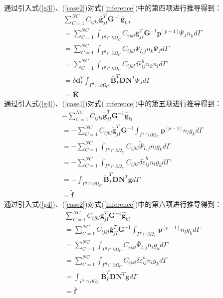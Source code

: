 通过引入式(\ref{g3})、(\ref{case2})对式(\ref{inference})中的第四项进行推导得到：
\begin{equation}\label{CH4-barK}
\begin{split}
    &\sum_{C=1}^{N\!C}C_{ijkl}\bar{\pmb g}^T_{jI}\pmb{G}^{-1}\bar{\pmb g}_{kJ}\\
    &=\sum_{C=1}^{N\!C}\int_{\Gamma^g\cap\partial\Omega_C}C_{ijkl}\bar{\pmb g}_{jI}^T\pmb{G}^{-1}\pmb{p}^{[p-1]}\Psi_Jn_kd\Gamma\\
    &=\sum_{C=1}^{N\!C}\int_{\Gamma^g\cap\partial\Omega_C}C_{ijkl}\bar{\Psi}_{I,j}n_k\Psi_{J}d\Gamma\\
    &=\sum_{C=1}^{N\!C}\int_{\Gamma^g\cap\partial\Omega_C}C_{ijkl}\delta\bar{\varepsilon}_{ij}^hn_ku_ld\Gamma\\
    &=\delta\pmb{d}_I^T\int_{\Gamma^g\cap\partial\Omega_C}\bar{\pmb{B}}_I^T\pmb{D}\pmb{N}^T\Psi_Jd\Gamma\\
    &=\bar{\pmb{K}}
\end{split}
\end{equation}
\newpage
通过引入式(\ref{g4})、(\ref{case1})对式(\ref{inference})中的第五项进行推导得到：
\begin{equation}\label{CH4-tildef}
\begin{split}
    &-\sum_{C=1}^{N\!C}C_{ijkl}\tilde{\pmb g}^T_{jI}\pmb{G}^{-1}\hat{\pmb g}_{kl}\\
    &=-\sum_{C=1}^{N\!C}C_{ijkl}\tilde{\pmb g}^T_{jI}\pmb{G}^{-1}\int_{\Gamma^g\cap\partial\Omega_C}\pmb{p}^{[p-1]}n_lg_kd\Gamma\\
    &=-\sum_{C=1}^{N\!C}\int_{\Gamma^g\cap\partial\Omega_C}C_{ijkl}\tilde{\Psi}_{I,j}n_lg_kd\Gamma\\
    &=-\sum_{C=1}^{N\!C}\int_{\Gamma^g\cap\partial\Omega_C}C_{ijkl}\delta\tilde{\varepsilon}_{ij}^hn_lg_kd\Gamma\\
    &=-\int_{\Gamma^g\cap\partial\Omega_C}\tilde{\pmb{B}}_I^T\pmb{D}\pmb{N}^T\pmb{g}d\Gamma\\
    &=\tilde{\pmb f}
\end{split}
\end{equation}
通过引入式(\ref{g4})、(\ref{case2})对式(\ref{inference})中的第六项进行推导得到：
\begin{equation}\label{CH4-barf}
\begin{split}
    &\sum_{C=1}^{N\!C}C_{ijkl}\bar{\pmb g}^T_{jI}\pmb{G}^{-1}\hat{\pmb g}_{kl}\\
    &=\sum_{C=1}^{N\!C}C_{ijkl}\bar{\pmb g}^T_{jI}\pmb{G}^{-1}\int_{\Gamma^g\cap\partial\Omega_C}\pmb{p}^{[p-1]}n_lg_kd\Gamma\\
    &=\sum_{C=1}^{N\!C}\int_{\Gamma^g\cap\partial\Omega_C}C_{ijkl}\bar{\Psi}_{I,j}n_lg_kd\Gamma\\
    &=\sum_{C=1}^{N\!C}\int_{\Gamma^g\cap\partial\Omega_C}C_{ijkl}\delta\bar{\varepsilon}_{ij}^hn_lg_kd\Gamma\\
    &=\int_{\Gamma^g\cap\partial\Omega_C}\bar{\pmb{B}}_I^T\pmb{D}\pmb{N}^T\pmb{g}d\Gamma\\
    &=\bar{\pmb f}
\end{split}
\end{equation}

